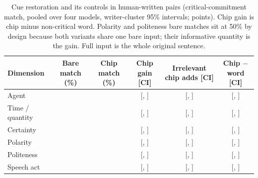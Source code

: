 \begin{table}[t]
\caption{Cue restoration and its controls in human-written pairs (critical-commitment match, pooled over four models, writer-cluster 95\% intervals; points). Chip gain is chip minus non-critical word. Polarity and politeness bare matches sit at 50\% by design because both variants share one bare input; their informative quantity is the gain. Full input is the whole original sentence.}\label{tab:sixdim}
\small
\begin{tabular}{lccccc}
\toprule
Dimension & Bare match (\%) & Chip match (\%) & Chip gain [CI] & Irrelevant chip adds [CI] & Chip $-$ word [CI] \\
\midrule
Agent & \jmhwMatchBareAgent{} & \jmhwMatchChipAgent{} & \jmctlGAgent{} [\jmctlGAgentLo{}, \jmctlGAgentHi{}] & \jmctlIrrelAddAgent{} [\jmctlIrrelAddAgentLo{}, \jmctlIrrelAddAgentHi{}] & \jmctlOverWordAgent{} [\jmctlOverWordAgentLo{}, \jmctlOverWordAgentHi{}] \\
Time / quantity & \jmhwMatchBareTime{} & \jmhwMatchChipTime{} & \jmctlGTime{} [\jmctlGTimeLo{}, \jmctlGTimeHi{}] & \jmctlIrrelAddTime{} [\jmctlIrrelAddTimeLo{}, \jmctlIrrelAddTimeHi{}] & \jmctlOverWordTime{} [\jmctlOverWordTimeLo{}, \jmctlOverWordTimeHi{}] \\
Certainty & \jmhwMatchBareCert{} & \jmhwMatchChipCert{} & \jmctlGCert{} [\jmctlGCertLo{}, \jmctlGCertHi{}] & \jmctlIrrelAddCert{} [\jmctlIrrelAddCertLo{}, \jmctlIrrelAddCertHi{}] & \jmctlOverWordCert{} [\jmctlOverWordCertLo{}, \jmctlOverWordCertHi{}] \\
Polarity & \jmhwMatchBarePol{} & \jmhwMatchChipPol{} & \jmctlGPol{} [\jmctlGPolLo{}, \jmctlGPolHi{}] & \jmctlIrrelAddPol{} [\jmctlIrrelAddPolLo{}, \jmctlIrrelAddPolHi{}] & \jmctlOverWordPol{} [\jmctlOverWordPolLo{}, \jmctlOverWordPolHi{}] \\
Politeness & \jmhwMatchBarePolite{} & \jmhwMatchChipPolite{} & \jmctlGPolite{} [\jmctlGPoliteLo{}, \jmctlGPoliteHi{}] & \jmctlIrrelAddPolite{} [\jmctlIrrelAddPoliteLo{}, \jmctlIrrelAddPoliteHi{}] & \jmctlOverWordPolite{} [\jmctlOverWordPoliteLo{}, \jmctlOverWordPoliteHi{}] \\
Speech act & \jmhwMatchBareAct{} & \jmhwMatchChipAct{} & \jmctlGAct{} [\jmctlGActLo{}, \jmctlGActHi{}] & \jmctlIrrelAddAct{} [\jmctlIrrelAddActLo{}, \jmctlIrrelAddActHi{}] & \jmctlOverWordAct{} [\jmctlOverWordActLo{}, \jmctlOverWordActHi{}] \\
\bottomrule
\end{tabular}
\end{table}

